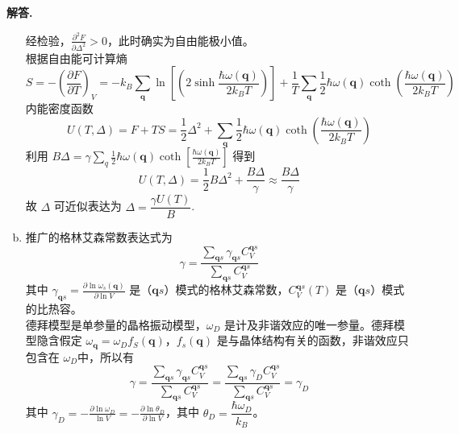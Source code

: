 \documentclass[11pt]{ctexart}
\newcounter{problemname}
\newenvironment{problem}{\begin{shaded}\stepcounter{problemname}\par\noindent\textbf{习题}\arabic{problemname}.}{\end{shaded}\par}
\newenvironment{solution}{\par\noindent\textbf{解答. }}{\par}
\begin{document}
\begin{solution}
\begin{enumerate}[(a)]
              经检验，$\displaystyle \frac{\partial^2 F}{\partial \Delta^2} > 0$，此时确实为自由能极小值。 \\[12pt]
              根据自由能可计算熵
              $$S = -\left(\frac{\partial F}{\partial T}\right)_V = -k_B\sum_{\mathbf{q}}\ln{\left[\left(2\sinh{\frac{\hbar\omega(\mathbf{q})}{2k_BT}}\right)\right]} + \frac{1}{T}\sum_{\mathbf{q}}\frac{1}{2}\hbar\omega(\mathbf{q})\coth{\left(\frac{\hbar\omega(\mathbf{q})}{2k_BT}\right)}$$
              内能密度函数
              $$U(T,\Delta) = F + TS = \frac{1}{2}\Delta^2 + \sum_{\mathbf{q}}\frac{1}{2}\hbar\omega(\mathbf{q})\coth{\left(\frac{\hbar\omega(\mathbf{q})}{2k_BT}\right)}$$
              利用 $\displaystyle B\Delta = \gamma\sum_{q}\frac{1}{2}\hbar\omega(\mathbf{q})\coth{\left[\frac{\hbar\omega(\mathbf{q})}{2k_BT}\right]}$ 得到
              $$U(T,\Delta) = \frac{1}{2}B\Delta^2 + \frac{B\Delta}{\gamma} \approx \frac{B\Delta}{\gamma}$$
              故  $\Delta$ 可近似表达为 $\Delta = \dfrac{\gamma U(T)}{B}$.
        \item 推广的格林艾森常数表达式为 
              $$\gamma = \frac{\displaystyle\sum_{\mathbf{q}s}\gamma_{\mathbf{q}s}C_V^{\mathbf{q}s}}{\displaystyle\sum_{\mathbf{q}s}C_V^{\mathbf{q}s}}$$
              其中 $\displaystyle\gamma_{\mathbf{q}s} = \frac{\partial\ln{\omega_s(\mathbf{q})}}{\partial\ln{V}}$ 是（$\mathbf{q}s$）模式的格林艾森常数，$\displaystyle C_V^{\mathbf{q}s}(T)$ 是（$\mathbf{q}s$）模式的比热容。 \\[12pt]
              德拜模型是单参量的晶格振动模型，$\omega_D$ 是计及非谐效应的唯一参量。德拜模型隐含假定 $\omega_{\mathbf{q}} = \omega_Df_S(\mathbf{q})$，$f_s(\mathbf{q})$ 是与晶体结构有关的函数，非谐效应只包含在 $\omega_D$中，所以有
              $$\gamma = \frac{\displaystyle\sum_{\mathbf{q}s}\gamma_{\mathbf{q}s}C_V^{\mathbf{q}s}}{\displaystyle\sum_{\mathbf{q}s}C_V^{\mathbf{q}s}} = \frac{\displaystyle\sum_{\mathbf{q}s}\gamma_{D}C_V^{\mathbf{q}s}}{\displaystyle\sum_{\mathbf{q}s}C_V^{\mathbf{q}s}} = \gamma_D$$
              其中 $\displaystyle\gamma_D = -\frac{\partial\ln{\omega_D}}{\ln{V}} = - \frac{\partial \ln{\theta_D}}{\partial\ln{V}}$，其中 $\theta_D = \dfrac{\hbar\omega_D}{k_B}$。
    \end{enumerate}
\end{solution}


\end{document}
